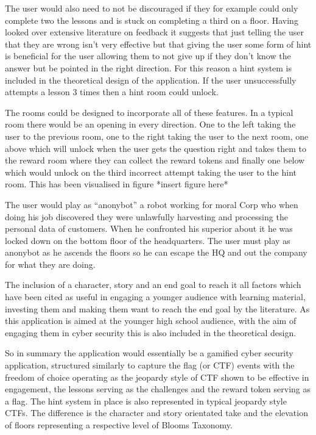 \documentclass[12pt,a4paper]{article}
\begin{document}

The user would also need to not be discouraged if they for example could only complete two the lessons and is stuck on completing a third on a floor. Having looked over extensive literature on feedback it suggests that just telling the user that they are wrong isn’t very effective but that giving the user some form of hint is beneficial for the user allowing them to not give up if they don’t know the answer but be pointed in the right direction. For this reason a hint system is included in the theoretical design of the application.  If the user unsuccessfully attempts a lesson 3 times then a hint room could unlock. 

The rooms could be designed to incorporate all of these features. In a typical room there would be an opening in every direction. One to the left taking the user to the previous room, one to the right taking the user to the next room, one above which will unlock when the user gets the question right and takes them to the reward room where they can collect the reward tokens and finally one below which would unlock on the third incorrect attempt taking the user to the hint room. This has been visualised in figure *insert figure here*  

The user would play as “anonybot” a robot working for moral Corp who when doing his job discovered they were unlawfully harvesting and processing the personal data of customers. When he confronted his superior about it he was locked down on the bottom floor of the headquarters. The user must play as anonybot as he ascends the floors so he can escape the HQ and out the company for what they are doing.

The inclusion of a character, story and an end goal to reach it all factors which have been cited as useful in engaging a younger audience with learning material, investing them and making them want to reach the end goal by the literature. As this application is aimed at the younger high school audience, with the aim of engaging them in cyber security this is also included in the theoretical design. 

So in summary the application would essentially be a gamified cyber security application, structured similarly to capture the flag (or CTF) events with the freedom of choice operating as the jeopardy style of CTF shown to be effective in engagement, the lessons serving as the challenges and the reward token serving as a flag. The hint system in place is also represented in typical jeopardy style CTFs. The difference is the character and story orientated take and the elevation of floors representing a respective level of Blooms Taxonomy. 
\end{document}
